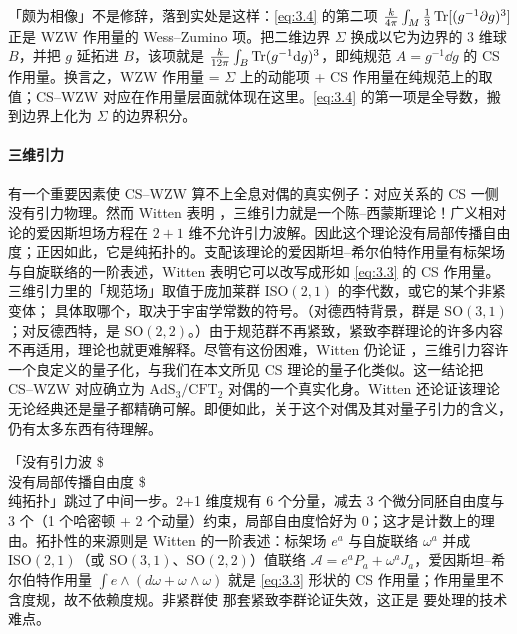\begin{yizhu}[含糊点]
「颇为相像」不是修辞，落到实处是这样：\eqref{eq:3.4} 的第二项 $\frac{k}{4\pi}\int_M\frac{1}{3}\operatorname{Tr}[(g^{-1}\partial g)^3]$ 正是 WZW 作用量的 Wess--Zumino 项。把二维边界 $\Sigma$ 换成以它为边界的 3 维球 $B$，并把 $g$ 延拓进 $B$，该项就是 $\frac{k}{12\pi}\int_B\operatorname{Tr}(g^{-1}\mathrm{d} g)^3$，即纯规范 $A=g^{-1}\dd g$ 的 CS 作用量。换言之，WZW 作用量 = $\Sigma$ 上的动能项 + CS 作用量在纯规范上的取值；CS--WZW 对应在作用量层面就体现在这里。\eqref{eq:3.4} 的第一项是全导数，搬到边界上化为 $\Sigma$ 的边界积分。
\end{yizhu}

\paragraph{三维引力}
有一个重要因素使 CS--WZW 算不上全息对偶的真实例子：对应关系的 CS 一侧没有引力物理。然而 Witten 表明 \cite{witten1988}，三维引力就是一个陈--西蒙斯理论！广义相对论的爱因斯坦场方程在 $2+1$ 维不允许引力波解。因此这个理论没有局部传播自由度；正因如此，它是纯拓扑的。支配该理论的爱因斯坦--希尔伯特作用量有标架场与自旋联络的一阶表述，Witten 表明它可以改写成形如 \eqref{eq:3.3} 的 CS 作用量。三维引力里的「规范场」取值于庞加莱群 $\mathrm{ISO}(2,1)$ 的李代数，或它的某个非紧变体；
具体取哪个，取决于宇宙学常数的符号。（对德西特背景，群是 $\mathrm{SO}(3,1)$；对反德西特，是 $\mathrm{SO}(2,2)$。）由于规范群不再紧致，紧致李群理论的许多内容不再适用，理论也就更难解释。尽管有这份困难，Witten 仍论证 \cite{witten2007}，三维引力容许一个良定义的量子化，与我们在本文所见 CS 理论的量子化类似。这一结论把 CS--WZW 对应确立为 $\mathrm{AdS}_3/\mathrm{CFT}_2$ 对偶的一个真实化身。Witten 还论证该理论无论经典还是量子都精确可解。即便如此，关于这个对偶及其对量子引力的含义，仍有太多东西有待理解。

\begin{yizhu}[含糊点]
「没有引力波 \$\\ 没有局部传播自由度 \$\\ 纯拓扑」跳过了中间一步。2+1 维度规有 6 个分量，减去 3 个微分同胚自由度与 3 个（1 个哈密顿 + 2 个动量）约束，局部自由度恰好为 0；这才是计数上的理由。拓扑性的来源则是 Witten \cite{witten1988} 的一阶表述：标架场 $e^a$ 与自旋联络 $\omega^a$ 并成 $\mathrm{ISO}(2,1)$（或 $\mathrm{SO}(3,1)$、$\mathrm{SO}(2,2)$）值联络 $\mathcal{A}=e^aP_a+\omega^aJ_a$，爱因斯坦--希尔伯特作用量 $\int e\wedge(d\omega+\omega\wedge\omega)$ 就是 \eqref{eq:3.3} 形状的 CS 作用量；作用量里不含度规，故不依赖度规。非紧群使 \cite{witten1989} 那套紧致李群论证失效，这正是 \cite{witten2007} 要处理的技术难点。
\end{yizhu}

